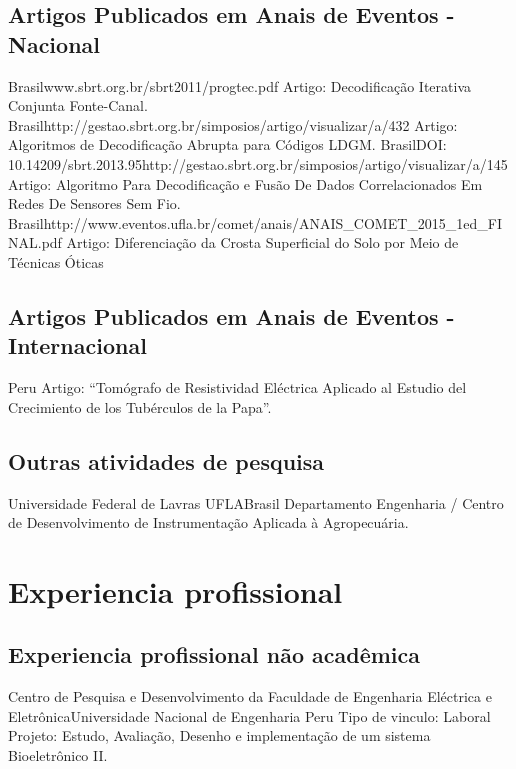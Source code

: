 \documentclass[11pt,a4paper,sans]{moderncv} %
\begin{document}
\subsection{Artigos Publicados em Anais de Eventos - Nacional}

	      {Brasil}{}{www.sbrt.org.br/sbrt2011/progtec.pdf}
	      {Artigo: Decodificação Iterativa Conjunta Fonte-Canal.}
	      {Brasil}{}{http://gestao.sbrt.org.br/simposios/artigo/visualizar/a/432}
	      {Artigo: Algoritmos de Decodificação Abrupta para Códigos LDGM.}
	      {Brasil}{DOI: 10.14209/sbrt.2013.95}{http://gestao.sbrt.org.br/simposios/artigo/visualizar/a/145}
	      {Artigo: Algoritmo Para Decodificação e Fusão De Dados Correlacionados Em Redes De Sensores Sem Fio.}			
	      {Brasil}{}{http://www.eventos.ufla.br/comet/anais/ANAIS\_COMET\_2015\_1ed\_FINAL.pdf}
	      {Artigo: Diferenciação da Crosta Superficial do Solo por Meio de Técnicas Óticas}
	      
\subsection{Artigos Publicados em Anais de Eventos - Internacional}
	      {Peru}{}{}
	      {Artigo: ``Tomógrafo de Resistividad Eléctrica Aplicado al Estudio del Crecimiento de los Tubérculos de la Papa''.}

\subsection{Outras atividades de pesquisa}
	      {Universidade Federal de Lavras}
	      {UFLA}{Brasil}
	      {Departamento Engenharia / Centro de Desenvolvimento de Instrumentação Aplicada à Agropecuária. }
\section{Experiencia profissional}
\subsection{Experiencia profissional não acadêmica}

		      {Centro de Pesquisa e Desenvolvimento da Faculdade de 
		      Engenharia Eléctrica e Eletrônica}{Universidade Nacional de Engenharia }{Peru}
		      {Tipo de vinculo: Laboral\newline{}
		      Projeto: Estudo, Avaliação, Desenho e implementação de um sistema Bioeletrônico II.}
\end{document}
